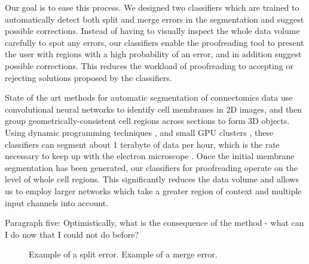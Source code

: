 Our goal is to ease this process. We designed two classifiers which are trained to automatically detect both split and merge errors in the segmentation and suggest possible corrections. Instead of having to visually inspect the whole data volume carefully to spot any errors, our classifiers enable the proofreading tool to present the user with regions with a high probability of an error, and in addition suggest possible corrections. This reduces the workload of proofreading to accepting or rejecting solutions proposed by the classifiers. %

State of the art methods for automatic segmentation of connectomics data use convolutional neural networks to identify cell membranes in 2D images, and then group geometrically-consistent cell regions across sections to form 3D objects. Using dynamic programming techniques , and small GPU clusters , these classifiers can segment about 1 terabyte of data per hour, which is the rate necessary to keep up with the electron microscope . Once the initial membrane segmentation has been generated, our classifiers for proofreading operate on the level of whole cell regions. This significantly reduces the data volume and allows us to employ larger networks which take a greater region of context and multiple input channels into account. 

Paragraph five: Optimistically, what is the consequence of the method - what can I do now that I could not do before?

\begin{figure}
\caption{Example of a split error. Example of a merge error.}
\end{figure}